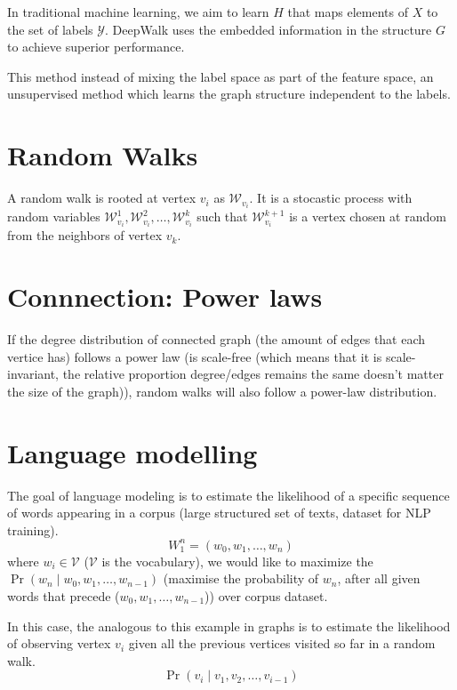 \documentclass{article}
\begin{document}
In traditional machine learning, we aim to learn $H$ that maps elements of $X$
to the set of labels $\mathcal{Y}$. DeepWalk uses the embedded information in
the structure $G$ to achieve superior performance.


This method instead of mixing the label space as part of the feature space, an
unsupervised method which learns the graph structure independent to the labels.

\section{Random Walks}
A random walk is rooted at vertex $v_i$ as $\mathcal{W}_{v_i}$. It is a
stocastic process with random variables
$\mathcal{W}_{v_i}^1,\mathcal{W}_{v_i}^2,\ldots, \mathcal{W}_{v_i}^k$ such that
$\mathcal{W}_{v_i}^{k+1}$ is a vertex chosen at random from the neighbors of
vertex $v_k$. 

\section{Connnection: Power laws}
If the degree distribution of connected graph (the amount of edges that each
vertice has) follows a power law (is scale-free (which means that it is
scale-invariant, the relative proportion degree/edges remains the same doesn't
matter the size of the graph)), random walks will also follow a power-law
distribution.

\section{Language modelling}
The goal of language modeling is to estimate the likelihood of a specific
sequence of words appearing in a corpus (large structured set of texts, dataset
for NLP training). \begin{equation} W_1^n = (w_0,w_1, \ldots , w_n)
\label{eq:1} \end{equation} where $w_i \in \mathcal{V}$ ($\mathcal{V}$ is the
vocabulary), we would like to maximize the $\Pr(w_n \mid w_0, w_1, \ldots,
w_{n-1})$ (maximise the probability of $w_n$, after all given words that
precede ($w_0, w_1,\ldots,w_{n-1}$)) over corpus dataset.

In this case, the analogous to this example in graphs is to estimate the
likelihood of observing vertex $v_i$ given all the previous vertices visited so
far in a random walk.
\begin{equation}
  \Pr(v_i \mid v_1,v_2,\ldots,v_{i-1})
  \label{eq:2}
\end{equation}
\end{document}
